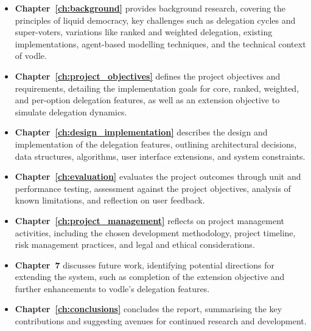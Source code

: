 \begin{itemize}
    \item \textbf{Chapter~\ref{ch:background}} provides background research, covering the principles of liquid democracy, key challenges such as delegation cycles and super-voters, variations like ranked and weighted delegation, existing implementations, agent-based modelling techniques, and the technical context of vodle.
    
    \item \textbf{Chapter~\ref{ch:project_objectives}} defines the project objectives and requirements, detailing the implementation goals for core, ranked, weighted, and per-option delegation features, as well as an extension objective to simulate delegation dynamics.
    
    \item \textbf{Chapter~\ref{ch:design_implementation}} describes the design and implementation of the delegation features, outlining architectural decisions, data structures, algorithms, user interface extensions, and system constraints.
    
    \item \textbf{Chapter~\ref{ch:evaluation}} evaluates the project outcomes through unit and performance testing, assessment against the project objectives, analysis of known limitations, and reflection on user feedback.
    
    \item \textbf{Chapter~\ref{ch:project_management}} reflects on project management activities, including the chosen development methodology, project timeline, risk management practices, and legal and ethical considerations.
    
    \item \textbf{Chapter~7} discusses future work, identifying potential directions for extending the system, such as completion of the extension objective and further enhancements to vodle's delegation features.
    
    \item \textbf{Chapter~\ref{ch:conclusions}} concludes the report, summarising the key contributions and suggesting avenues for continued research and development.
\end{itemize}
